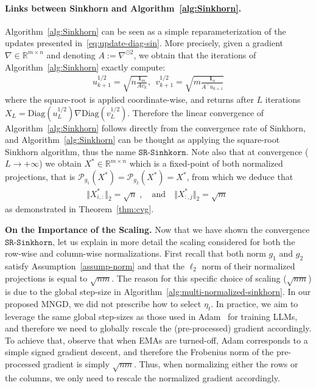 \paragraph{Links between Sinkhorn and Algorithm~\ref{alg:Sinkhorn}.} Algorithm~\ref{alg:Sinkhorn} can be seen as a simple reparameterization of the updates presented in~\eqref{eq:update-diag-sin}. More precisely, given a gradient $\nabla\in\mathbb{R}^{m\times n}$ and denoting $A:=\nabla^{\odot 2}$, we obtain that the iterations of Algorithm~\ref{alg:Sinkhorn} exactly compute:
\begin{align}
\label{eq:update-diag-sin-sr}
    u_{k+1}^{1/2} = \sqrt{n\frac{ \bm{1}_m}{Av_k}},~~v_{k+1}^{1/2} = \sqrt{m\frac{\bm{1}_n}{ A^\top u_{k+1}}}
\end{align}
where the square-root is applied coordinate-wise, and returns after $L$ iterations $X_L=\text{Diag}(u_{L}^{1/2})\nabla \text{Diag}(v_{L}^{1/2})$. Therefore the linear convergence of Algorithm~\ref{alg:Sinkhorn} follows directly from the convergence rate of Sinkhorn, and Algorithm~\ref{alg:Sinkhorn} can be thought as applying the square-root Sinkhorn algorithm, thus the name $\texttt{SR-Sinhkorn}$. Note also that at convergence ($L\to+\infty$) we obtain $X^{*}\in\mathbb{R}^{m\times n}$ which is a fixed-point of both normalized projections, that is $\mathcal{P}_{g_1}(X^*)=\mathcal{P}_{g_2}(X^*)=X^*$,
from which we deduce that
\begin{align*}
\Vert X^*_{i,:}\Vert_2 = \sqrt{n}\;, \quad \text{and}\quad   \Vert X^*_{:,j}\Vert_2 = \sqrt{m}\;
\end{align*}
as demonstrated in Theorem~\ref{thm:cvg}.



\textbf{On the Importance of the Scaling.} Now that we have shown the convergence $\texttt{SR-Sinkhorn}$, let us explain in more detail the scaling considered for both the row-wise and column-wise normalizations. First recall that both norm $g_1$ and $g_2$ satisfy Assumption~\ref{assump-norm} and that the $\ell_2$ norm of their normalized projections is equal to $\sqrt{nm}$. The reason for this specific choice of scaling ($\sqrt{nm}$) is due to the global step-size in Algorithm~\ref{alg:multi-normalized-sinkhorn}. In our proposed MNGD, we did not prescribe how to select $\eta_t$. In practice, we aim to leverage the same global step-sizes as those used in Adam~\cite{adam} for training LLMs, and therefore we need to globally rescale the (pre-processed) gradient accordingly. To achieve that, observe that when EMAs are turned-off, Adam corresponds to a simple signed gradient descent, and therefore the Frobenius norm of the pre-processed gradient is simply $\sqrt{nm}$. Thus, when normalizing either the rows or the columns, we only need to rescale the normalized gradient accordingly.


